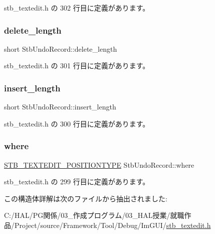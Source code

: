  stb\+\_\+textedit.\+h の 302 行目に定義があります。

\mbox{\label{struct_stb_undo_record_ad81789175cef417a0fe58204277fd735}} 
\subsubsection{\texorpdfstring{delete\+\_\+length}{delete\_length}}
{\footnotesize\ttfamily short Stb\+Undo\+Record\+::delete\+\_\+length}



 stb\+\_\+textedit.\+h の 301 行目に定義があります。

\mbox{\label{struct_stb_undo_record_ae2a3af79db791549db0c42263407cab5}} 
\subsubsection{\texorpdfstring{insert\+\_\+length}{insert\_length}}
{\footnotesize\ttfamily short Stb\+Undo\+Record\+::insert\+\_\+length}



 stb\+\_\+textedit.\+h の 300 行目に定義があります。

\mbox{\label{struct_stb_undo_record_a49e87adbb75a18ffba1f853ac974b31d}} 
\subsubsection{\texorpdfstring{where}{where}}
{\footnotesize\ttfamily \mbox{\hyperlink{stb__textedit_8h_a5d0c1b8751b6517e3d817f2a025ed654}{S\+T\+B\+\_\+\+T\+E\+X\+T\+E\+D\+I\+T\+\_\+\+P\+O\+S\+I\+T\+I\+O\+N\+T\+Y\+PE}} Stb\+Undo\+Record\+::where}



 stb\+\_\+textedit.\+h の 299 行目に定義があります。



この構造体詳解は次のファイルから抽出されました\+:\begin{DoxyCompactItemize}
\item 
C\+:/\+H\+A\+L/\+P\+G関係/03\+\_\+作成プログラム/03\+\_\+\+H\+A\+L授業/就職作品/\+Project/source/\+Framework/\+Tool/\+Debug/\+Im\+G\+U\+I/\mbox{\hyperlink{stb__textedit_8h}{stb\+\_\+textedit.\+h}}\end{DoxyCompactItemize}
